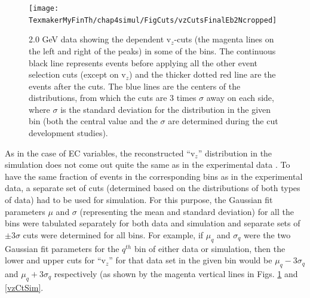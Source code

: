 \begin{figure}[H]%
\centering
\leavevmode \texttt{[image: TexmakerMyFinTh/chap4simul/FigCuts/vzCutsFinalEb2Ncropped]}  %
\caption[v$_z$ cuts (Exp.)]{2.0 GeV data showing the \qsqs dependent v$_z$-cuts (the magenta lines on the left and right of the peaks) in some of the \qsqs bins. The continuous black line represents events before applying all the other event selection cuts (except on v$_z$) and the thicker dotted red line are the events after the cuts. The blue lines are the centers of the distributions, from which the cuts are 3 times $\sigma$ away on each side, where $\sigma$ is the standard deviation for the distribution in the given \qsqs bin (both the central value and the $\sigma$ are determined during the cut development studies).}
\label{vzCtExp}
\end{figure}

As in the case of EC variables, the reconstructed ``v$_z$'' distribution in the simulation does not come out quite the same as in the experimental data %
. To have the same fraction of events in the corresponding \qsqs bins as in the experimental data, a separate set of cuts (determined based on the distributions of both types of data) had to be used for simulation. For this purpose, the Gaussian fit parameters $\mu$ and $\sigma$ (representing the mean and standard deviation) for all the \qsqs bins were tabulated separately for both data and simulation and separate sets of $\pm 3\sigma$ cuts were determined for all bins. For example, if $\mu_q$ and $\sigma_q$ were the two Gaussian fit parameters for the $q^{th}$ \qsqs bin of either data or simulation, then the lower and upper cuts for ``v$_z$'' for that data set in the given \qsqs bin would be $\mu_q - 3\sigma_q$ and $\mu_q + 3\sigma_q$ respectively (as shown by the magenta vertical lines in Figs. \ref{vzCtExp} and \ref{vzCtSim}.





